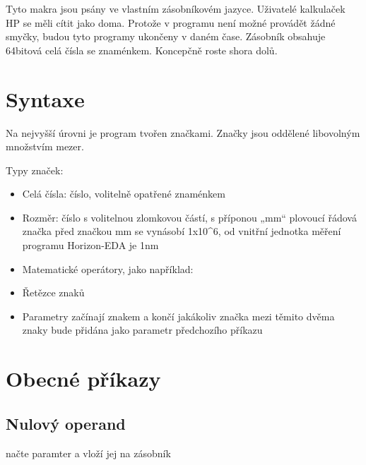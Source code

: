\documentclass[letterpaper,10pt,czech]{sphinxmanual}
\begin{document}
Tyto makra jsou psány ve vlastním zásobníkovém jazyce. Uživatelé kalkulaček HP se měli cítit jako doma. Protože v programu není možné provádět žádné smyčky, budou tyto programy ukončeny v daném čase. Zásobník obsahuje 64bitová celá čísla se znaménkem. Koncepčně roste shora dolů.


\section{Syntaxe}
\label{\detokenize{parameter-programs:syntaxe}}
Na nejvyšší úrovni je program tvořen značkami. Značky jsou oddělené libovolným množstvím mezer.

Typy značek:
\begin{itemize}
\item {} 
Celá čísla: číslo, volitelně opatřené znaménkem

\item {} 
Rozměr: číslo s volitelnou zlomkovou částí, s příponou „mm“ plovoucí řádová značka před značkou mm se vynásobí 1x10\textasciicircum{}6, od vnitřní jednotka měření programu Horizon-EDA je 1nm

\item {} 
Matematické operátory, jako například: \sphinxcode{\sphinxupquote{+ - * /}}

\item {} 
Řetězce znaků

\item {} 
Parametry začínají znakem \sphinxcode{\sphinxupquote{{[}}} a končí \sphinxcode{\sphinxupquote{{]}}} jakákoliv značka mezi těmito dvěma znaky bude přidána jako parametr předchozího příkazu

\end{itemize}


\section{Obecné příkazy}
\label{\detokenize{parameter-programs:obecne-prikazy}}

\subsection{Nulový operand}
\label{\detokenize{parameter-programs:nulovy-operand}}
 načte paramter a vloží jej na zásobník
\end{document}
